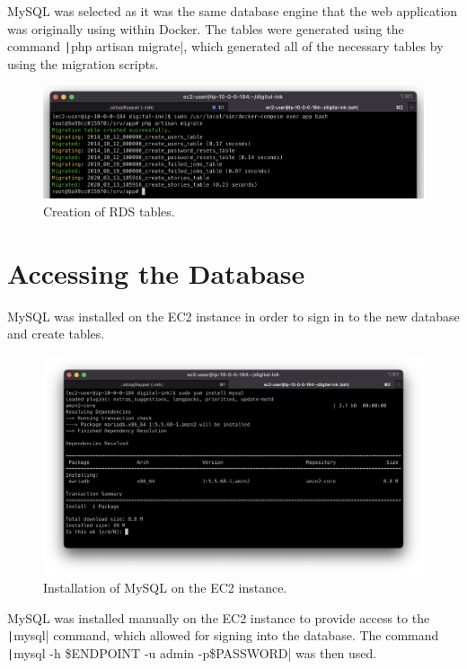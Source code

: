 MySQL was selected as it was the same database engine that the web application was originally using within Docker.
The tables were generated using the command \texttt|php artisan migrate|, which generated all of the necessary
tables by using the migration scripts.

\begin{figure}[!htbp]
    \centering
    \includegraphics[width=\textwidth]{resources/rds/rds-tables-creation}
    \caption{Creation of RDS tables.}
    \label{fig:rds-tables}
\end{figure}

\clearpage
\section{Accessing the Database}\label{sec:accessing-the-new-database}
MySQL was installed on the EC2 instance in order to sign in to the new database and create tables.

\begin{figure}[!htbp]
    \centering
    \includegraphics[width=125mm]{resources/rds/rds-mysql-install}
    \caption{Installation of MySQL on the EC2 instance.}
    \label{fig:rds-msql-install}
\end{figure}

MySQL was installed manually on the EC2 instance to provide access to the \texttt|mysql| command,
which allowed for signing into the database.
The command \texttt|mysql -h \$ENDPOINT -u admin -p\$PASSWORD| was then used.

